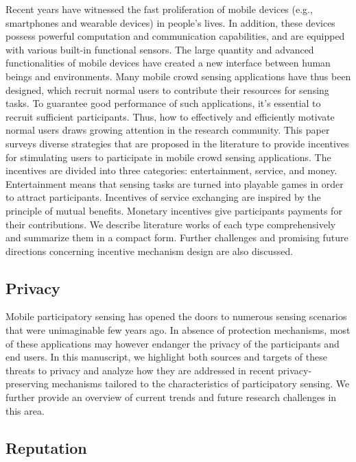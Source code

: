 \documentclass{sig-alternate}
\begin{document}
Recent years have witnessed the fast proliferation of mobile devices (e.g., smartphones and wearable devices) in people’s lives. In addition, these devices possess powerful computation and communication capabilities, and are equipped with various built-in functional sensors. The large quantity and advanced functionalities of mobile devices have created a new interface between human beings and environments. Many mobile crowd sensing applications have thus been designed, which recruit normal users to contribute their resources for sensing tasks. To guarantee good performance of such applications, it’s essential to recruit sufficient participants. Thus, how to effectively and efficiently motivate normal users draws growing attention in the research community. This paper surveys diverse strategies that are proposed in the literature to provide incentives for stimulating users to participate in mobile crowd sensing applications. The incentives are divided into three categories: entertainment, service, and money. Entertainment means that sensing tasks are turned into playable games in order to attract participants. Incentives of service exchanging are inspired by the principle of mutual benefits. Monetary incentives give participants payments for their contributions. We describe literature works of each type comprehensively and summarize them in a compact form. Further challenges and promising future directions concerning incentive mechanism design are also discussed. \cite{7065282}

\subsection{Privacy}
Mobile participatory sensing has opened the doors to numerous sensing scenarios that were unimaginable few years ago. In absence of protection mechanisms, most of these applications may however endanger the privacy of the participants and end users. In this manuscript, we highlight both sources and targets of these threats to privacy and analyze how they are addressed in recent privacy-preserving mechanisms tailored to the characteristics of participatory sensing. We further provide an overview of current trends and future research challenges in this area. \cite{Christin2015}

\subsection{Reputation}
\end{document}
